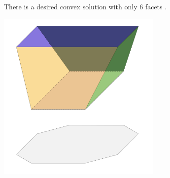 \begin{solution}
	There is a desired convex solution with only 6 facets .\\[0.2cm]
\begin{center}
	\includegraphics[width=8cm]{57/figs/57_an1.png}
\end{center}
\end{solution}